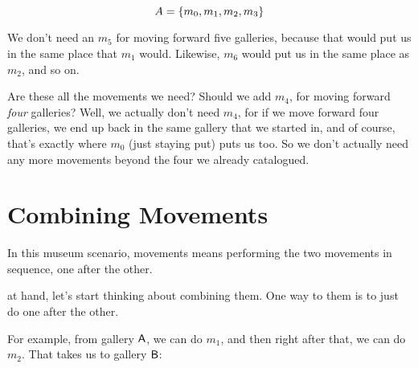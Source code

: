 \documentclass[../../../main.tex]{subfiles}
\begin{document}
\begin{equation*}
  A = \{ m_{0}, m_{1}, m_{2}, m_{3} \}
\end{equation*}

\begin{aside}
  \begin{remark}
    We don't need an $m_{5}$ for moving forward five galleries, because that would put us in the same place that $m_{1}$ would. Likewise, $m_{6}$ would put us in the same place as $m_{2}$, and so on.
  \end{remark}
\end{aside}

Are these all the movements we need? Should we add $m_{4}$, for moving forward \emph{four} galleries? Well, we actually don't need $m_{4}$, for if we move forward four galleries, we end up back in the same gallery that we started in, and of course, that's exactly where $m_{0}$ (just staying put) puts us too. So we don't actually need any more movements beyond the four we already catalogued.


\section{Combining Movements}

\begin{terminology}
  In this museum scenario,  movements means performing the two movements in sequence, one after the other.
\end{terminology}

 at hand, let's start thinking about combining them. One way to  them is to just do one after the other. 

For example, from gallery $\mathsf{A}$, we can do $m_{1}$, and then right after that, we can do $m_{2}$. That takes us to gallery $\mathsf{B}$:
\end{document}
